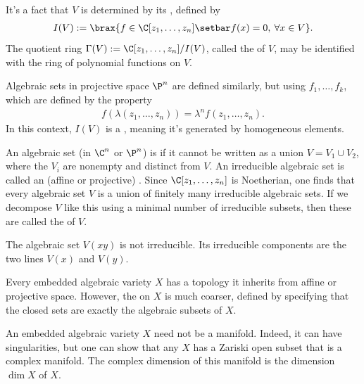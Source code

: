 \documentclass[11pt]{report}
\begin{document}
\begin{rmk}
It's a fact that $V$ is determined by its  , defined by
\begin{align*}
I(V):= \brax{f \in \C[z_1,\dots,z_n] \setbar f(x)=0, \: \forall x \in V}.
\end{align*}
The quotient ring $\Gamma(V):=\C[z_1,\dots,z_n]/I(V)$, called the  of $V$, may be identified with the ring of polynomial functions on $V$.
\end{rmk}

\begin{defn}
Algebraic sets in projective space $\P^n$ are defined similarly, but using  $f_1,\dots,f_k$, which are defined by the property
\begin{align*}
f(\lambda(z_1,\dots,z_n))=\lambda^n f(z_1,\dots,z_n).
\end{align*}
In this context, $I(V)$ is a , meaning it's generated by homogeneous elements.
\end{defn}

\begin{defn}
An algebraic set (in $\C^n$ or $\P^n$) is  if it cannot be written as a union $V=V_1 \cup V_2$, where the $V_i$ are nonempty and distinct from $V$. An irreducible algebraic set is called an (affine or projective) . Since $\C[z_1,\dots,z_n]$ is Noetherian, one finds that every algebraic set $V$ is a union of finitely many irreducible algebraic sets. If we decompose $V$ like this using a minimal number of irreducible subsets, then these are called the  of $V$.
\end{defn}

\begin{ex}
The algebraic set $V(xy)$ is not irreducible. Its irreducible components are the two lines $V(x)$ and $V(y)$.
\end{ex}

\begin{defn}
Every embedded algebraic variety $X$ has a topology it inherits from affine or projective space. However, the  on $X$ is much coarser, defined by specifying that the closed sets are exactly the algebraic subsets of $X$.
\end{defn}

\begin{rmk}
An embedded algebraic variety $X$ need not be a manifold. Indeed, it can have singularities, but one can show that any $X$ has a Zariski open subset that is a complex manifold. The complex dimension of this manifold is the dimension $\dim X$ of $X$.
\end{rmk}
\end{document}
